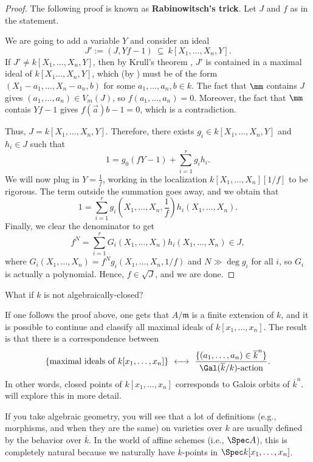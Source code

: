 \begin{proof}
    The following proof is known as \textbf{Rabinowitsch's trick}. Let $J$ and $f$ as in the statement.
    
    We are going to add a variable $Y$ and consider an ideal
    $$J' := (J, Yf-1)\ \subseteq\ k[X_1,\dots,X_n,Y].$$
    If $J'\neq k[X_1,\dots,X_n,Y]$, then
    by Krull's theorem ,
    $J'$ is contained in a maximal ideal 
    of $k[X_1\dots,X_n,Y]$, which 
    (by ) must be of the form
    $(X_1-a_1,\dots,X_n-a_n,b)$ for some $a_1,\dots,a_n,b\in k$.
    The fact that $\mm$ contains $J$ gives
    $(a_1,\dots,a_n)\in V_m(J)$, so
    $f(a_1,\dots,a_n)=0$.
    Moreover, the fact that $\mm$ contais $Yf-1$ 
    gives $f(\vec a)b-1 = 0$, which is a contradiction.
    
    Thus, $J=k[X_1,\dots,X_n,Y]$.
    Therefore, there exists 
    $g_i\in k[X_1,\dots,X_n,Y]$ and $h_i\in J$
    such that
    $$1 =  g_0(fY-1) + \sum_{i=1}^r g_i h_i.$$
    We will now plug in $Y=\frac 1f$,
    working in the localization $k[X_1,\dots,X_n][1/f]$
    to be rigorous. The term outside the summation goes away,
    and we obtain that
    $$1 = \sum_{i=1}^r g_i\left(X_1,\dots,X_n, \frac 1f\right)
    h_i(X_1,\dots,X_n).$$
    Finally, we clear the denominator to get
    $$f^N = \sum_{i=1}^r G_i(X_1,\dots,X_n)
    h_i(X_1,\dots,X_n)\in J,$$
    where $G_i(X_1,\dots,X_n) = f^N g_i(X_1,\dots,X_n,1/f)$
    and $N \gg \deg g_i$ for all $i$,
    so $G_i$ is actually a polynomial.
    Hence, $f\in\sqrt J$, and we are done.
\end{proof}

\begin{remark}
What if $k$ is not algebraically-closed?

If one follows the proof above,
one gets that $A/\mathfrak m$ is a finite extension of $k$,
and it is possible to continue and classify all
maximal ideals of $k[x_1,\dots,x_n]$.
The result is that there is a correspondence between
$$\{\text{maximal ideals of }k[x_1,\dots,x_n]\}
\ \longleftrightarrow\ \frac{\{(a_1,\dots,a_n)\in \overline k^n\}}
{\Gal(\overline k/k)\text{-action}}.$$
In other words, closed points of $k[x_1,\dots,x_n]$
corresponds to Galois orbits of $\overline k^n$.
 will explore 
this in more detail.


If you take algebraic geometry, you will see that 
a lot of definitions (e.g., morphisms, and when
they are the same) on varieties over $k$
are usually defined by the behavior over $\overline k$.
In the world of affine schemes (i.e., $\Spec A$),
this is completely natural because we naturally
have $\overline k$-points in $\Spec k[x_1,\dots,x_n]$.
\end{remark}

